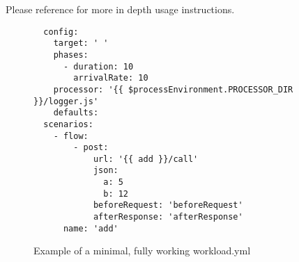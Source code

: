 \documentclass[../main.tex]{subfiles}
\begin{document}
Please reference  for more in depth usage instructions.

\begin{figure}[H]
  \begin{tcolorbox}[titleDetachedStyle, title=\texttt{workload.yml}]
  \begin{verbatim}
  config:
    target: ' '
    phases:
      - duration: 10
        arrivalRate: 10
    processor: '{{ $processEnvironment.PROCESSOR_DIR }}/logger.js'
    defaults:
  scenarios:
    - flow:
        - post:
            url: '{{ add }}/call'
            json:
              a: 5
              b: 12
            beforeRequest: 'beforeRequest'
            afterResponse: 'afterResponse'
      name: 'add'
  \end{verbatim}
\end{tcolorbox}
\caption{Example of a minimal, fully working workload.yml}
\label{fig:exampleWorkloadYML}
\end{figure}
\end{document}
